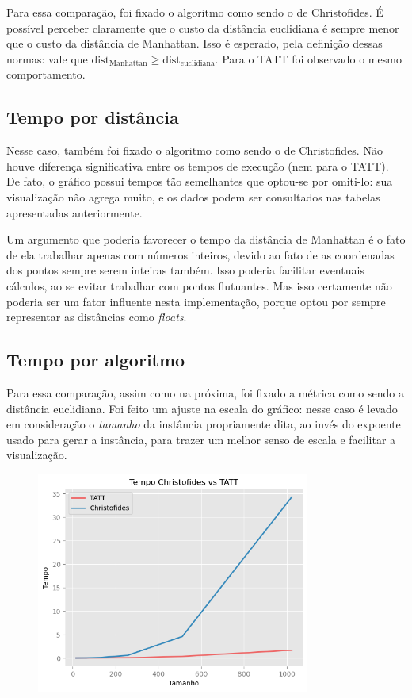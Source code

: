 \documentclass{article}
\begin{document}
Para essa comparação, foi fixado o algoritmo como sendo o de Christofides. É possível perceber claramente que o custo da distância euclidiana é sempre menor que o custo da distância de Manhattan. Isso é esperado, pela definição dessas normas: vale que \( \textrm{dist}_{\textrm{Manhattan}}  \geq \textrm{dist}_{\textrm{euclidiana}} \). Para o TATT foi observado o mesmo comportamento.

\subsection{Tempo por distância}

Nesse caso, também foi fixado o algoritmo como sendo o de Christofides. Não houve diferença significativa entre os tempos de execução (nem para o TATT). De fato, o gráfico possui tempos tão semelhantes que optou-se por omiti-lo: sua visualização não agrega muito, e os dados podem ser consultados nas tabelas apresentadas anteriormente.

Um argumento que poderia favorecer o tempo da distância de Manhattan é o fato de ela trabalhar apenas com números inteiros, devido ao fato de as coordenadas dos pontos sempre serem inteiras também. Isso poderia facilitar eventuais cálculos, ao se evitar trabalhar com pontos flutuantes. Mas isso certamente não poderia ser um fator influente nesta implementação, porque optou por sempre representar as distâncias como \textit{floats}.

\subsection{Tempo por algoritmo}

Para essa comparação, assim como na próxima, foi fixado a métrica como sendo a distância euclidiana. Foi feito um ajuste na escala do gráfico: nesse caso é levado em consideração o \textit{tamanho} da instância propriamente dita, ao invés do expoente usado para gerar a instância, para trazer um melhor senso de escala e facilitar a visualização.

\begin{figure} [H]
	\includegraphics[width=9cm]{tempo_vs}
	\centering
\end{figure}
\end{document}
